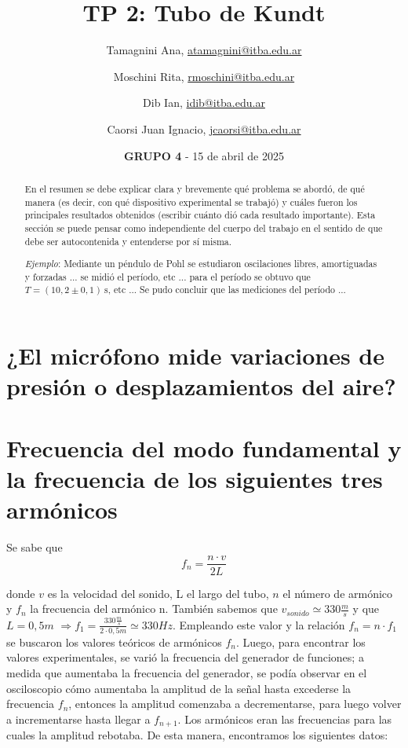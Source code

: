 \documentclass[12pt,a4paper]{article}
\title{TP 2: Tubo de Kundt}
\author{Tamagnini Ana, \href{atamagnini@itba.edu.ar}{atamagnini@itba.edu.ar} 
\and Moschini Rita, \href{rmoschini@itba.edu.ar}{rmoschini@itba.edu.ar}
\and Dib Ian, \href{idin@itba.edu.ar}{idib@itba.edu.ar}
\and Caorsi Juan Ignacio, \href{jcaorsi@itba.edu.ar}{jcaorsi@itba.edu.ar}
}
\date{\textbf{GRUPO 4} - 15 de abril de 2025}
\begin{document}
\maketitle

\begin{abstract}

En el resumen se debe explicar clara y brevemente qué problema se abordó, de qué manera (es decir, con qué dispositivo experimental se trabajó) y cuáles fueron los principales resultados obtenidos (escribir cuánto dió cada resultado importante). Esta sección se puede pensar como independiente del cuerpo del trabajo en el sentido de que debe ser autocontenida y entenderse por sí misma.

\textit{Ejemplo}: Mediante un péndulo de Pohl se estudiaron oscilaciones libres, amortiguadas y forzadas ... se midió el período, etc ... para el período se obtuvo que $T = (10,2 \pm 0,1) \ \mathrm{s}$, etc ... Se pudo concluir que las mediciones del período ...

\end{abstract}

\section{¿El micrófono mide variaciones de presión o desplazamientos del aire?}


\section{Frecuencia del modo fundamental y la frecuencia de los siguientes tres armónicos}

Se sabe que
\begin{equation}
    f_{n}=\frac{n\cdot v}{2L}
\end{equation}

donde $v$ es la velocidad del sonido, L el largo del tubo, $n$ el número de armónico y $f_{n}$ la frecuencia del armónico n. También sabemos que $v_{sonido}\simeq 330 \frac{m}{s}$ y que $L=0,5 m$
$\Rightarrow f_{1}=\frac{330 \frac{m}{s} }{2 \cdot 0,5m} \simeq 330 Hz $. Empleando este valor y la relación $f_{n}=n\cdot f_{1}$ se buscaron los valores teóricos de armónicos $f_{n}$. Luego, para encontrar los valores experimentales, se varió la frecuencia del generador de funciones; a medida que aumentaba la frecuencia del generador, se podía observar en el osciloscopio cómo aumentaba la amplitud de la señal hasta excederse la frecuencia $f_{n}$, entonces la amplitud comenzaba a decrementarse, para luego volver a incrementarse hasta llegar a $f_{n+1}$. Los armónicos eran las frecuencias para las cuales la amplitud rebotaba.
De esta manera, encontramos los siguientes datos:
\end{document}
